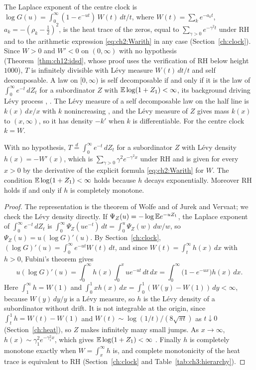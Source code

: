 The Laplace exponent of the centre clock is $\log G(u)=\int_0^\infty(1-e^{-ut})\,W(t)\,dt/t$, where $W(t)=\sum_ke^{-a_kt}$, $a_k=-(\rho_k-\frac12)^2$, is the heat trace of the zeros, equal to $\sum_{\gamma>0}e^{-\gamma^2t}$ under RH and to the arithmetic expression \eqref{eq:ch2:Warith} in any case (Section~\ref{ch:clock}). Since $W>0$ and $W'<0$ on $(0,\infty)$ with no hypothesis (Theorem~\ref{thm:ch12:idsd}, whose proof uses the verification of RH below height $1000$), $T$ is infinitely divisible with L\'evy measure $W(t)\,dt/t$ and self decomposable. A law on $[0,\infty)$ is self decomposable if and only if it is the law of $\int_0^\infty e^{-t}\,dZ_t$ for a subordinator $Z$ with $\mathbb{E}\log(1+Z_1)<\infty$, its background driving L\'evy process \cite{Wolfe82,JurekVervaat83}, \cite[Theorem 17.5]{Sato99}. The L\'evy measure of a self decomposable law on the half line is $k(x)\,dx/x$ with $k$ nonincreasing \cite[Corollary 15.11]{Sato99}, and the L\'evy measure of $Z$ gives mass $k(x)$ to $(x,\infty)$, so it has density $-k'$ when $k$ is differentiable. For the centre clock $k=W$.

\begin{proposition}\label{sb:prop:bdlp}
With no hypothesis, $T\stackrel d=\int_0^\infty e^{-t}\,dZ_t$ for a subordinator $Z$ with L\'evy density $h(x)=-W'(x)$, which is $\sum_{\gamma>0}\gamma^2e^{-\gamma^2x}$ under RH and is given for every $x>0$ by the derivative of the explicit formula \eqref{eq:ch2:Warith} for $W$. The condition $\mathbb{E}\log(1+Z_1)<\infty$ holds because $h$ decays exponentially. Moreover RH holds if and only if $h$ is completely monotone.
\end{proposition}

\begin{proof}
The representation is the theorem of Wolfe and of Jurek and Vervaat; we check the L\'evy density directly. If $\Psi_Z(u)=-\log\mathbb{E} e^{-uZ_1}$, the Laplace exponent of $\int_0^\infty e^{-t}\,dZ_t$ is $\int_0^\infty\Psi_Z(ue^{-t})\,dt=\int_0^u\Psi_Z(w)\,dw/w$, so $\Psi_Z(u)=u(\log G)'(u)$. By Section~\ref{ch:clock}, $(\log G)'(u)=\int_0^\infty e^{-ut}W(t)\,dt$, and since $W(t)=\int_t^\infty h(x)\,dx$ with $h>0$, Fubini's theorem gives
\[
u(\log G)'(u)=\int_0^\infty h(x)\int_0^xue^{-ut}\,dt\,dx=\int_0^\infty\big(1-e^{-ux}\big)h(x)\,dx .
\]
Here $\int_1^\infty h=W(1)$ and $\int_0^1xh(x)\,dx=\int_0^1(W(y)-W(1))\,dy<\infty$, because $W(y)\,dy/y$ is a L\'evy measure, so $h$ is the L\'evy density of a subordinator without drift. It is not integrable at the origin, since $\int_t^1h=W(t)-W(1)$ and $W(t)\sim\log(1/t)/(8\sqrt{\pi t})$ as $t\downarrow0$ (Section~\ref{ch:heat}), so $Z$ makes infinitely many small jumps. As $x\to\infty$, $h(x)\sim\gamma_1^2e^{-\gamma_1^2x}$, which gives $\mathbb{E}\log(1+Z_1)<\infty$ \cite[Theorem 25.3]{Sato99}. Finally $h$ is completely monotone exactly when $W=\int_x^\infty h$ is, and complete monotonicity of the heat trace is equivalent to RH (Section~\ref{ch:clock} and Table~\ref{tab:ch3:hierarchy}).
\end{proof}

